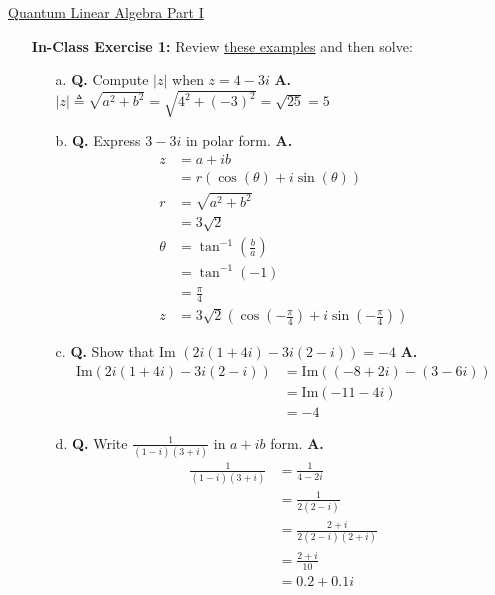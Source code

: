 \documentclass[main.tex]{subfiles}
\begin{document}
\href{https://www2.seas.gwu.edu/~simhaweb/quantum/modules/module2/module2.html}{Quantum Linear Algebra Part I}

\begin{enumerate}

\item[] \textbf{In-Class Exercise 1:} Review \href{https://www2.seas.gwu.edu/~simhaweb/quantum/modules/module2/problems2.html#complex}{these examples} and then solve:

    \begin{enumerate}
        \item[a.] \textbf{Q.} Compute $|z|$ when $z = 4-3i$ \textbf{A.} $|z| \triangleq \sqrt{a^{2}+b^{2}} = \sqrt{4^2 + (-3)^2} = \sqrt{25} = 5$ 
        
        \item[b.] \textbf{Q.} Express $3-3 i$ in polar form. \textbf{A.}
        \begin{align*}
            z       & = a+ib \\
                    & = r(\cos (\theta)+i \sin (\theta)) \\
            r       & = \sqrt{a^2 + b^2} \\ 
                    & = 3\sqrt{2} \\
            \theta  & = \tan^{-1}(\frac{b}{a}) \\ 
                    & = \tan^{-1}(-1) \\ 
                    & = \frac{\pi}{4}\\ 
            z       & =3\sqrt{2}(\cos (-\frac{\pi}{4})+i \sin (-\frac{\pi}{4})) 
        \end{align*}
        
        \item[c.] \textbf{Q.} Show that Im $(2 i(1+4 i)-3 i(2-i))=-4$ \textbf{A.} 
        \begin{align*}
            \text{Im}(2i(1+4i)-3i(2-i)) & = \text{Im}((-8 + 2i) - (3 - 6i))\\
                                        & = \text{Im}(-11 - 4i)\\
                                        & = -4
        \end{align*}
        
        \item[d.] \textbf{Q.} Write $\frac{1}{(1-i)(3+i)}$ in $a+ib$ form. \textbf{A.}
        \begin{align*}
            \frac{1}{(1-i)(3+i)} &= \frac{1}{4-2i}\\
                                    &= \frac{1}{2(2-i)}\\
                                    &= \frac{2+i}{2(2-i)(2+i)}\\
                                    &= \frac{2+i}{10}\\
                                    &= 0.2 + 0.1i
        \end{align*}
        

\end{enumerate}
\end{enumerate}
\end{document}

